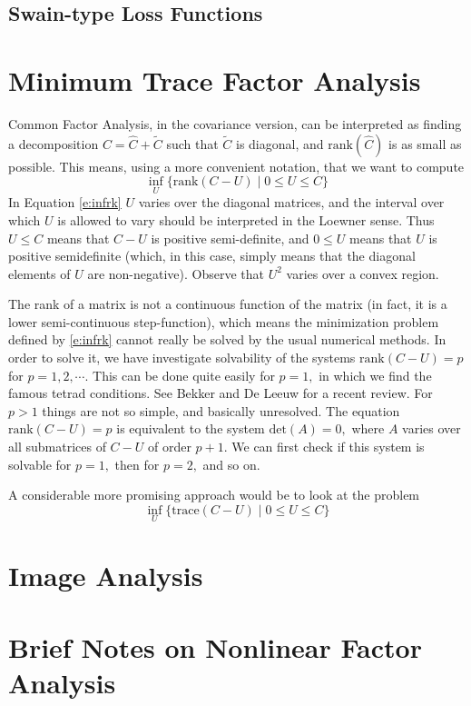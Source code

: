 \documentclass[12pt]{amsart}
\theoremstyle{definition}
\theoremstyle{remark}
\numberwithin{equation}{section}
\begin{document}
\subsection{Swain-type Loss Functions}
\section{Minimum Trace Factor Analysis}
Common Factor Analysis, in the covariance version, can be interpreted as finding
a decomposition $C=\hat C+\tilde C$ such that $\tilde C$ is diagonal, and
$\mathrm{rank}(\hat C)$ is as small as possible. This means, using a more
convenient notation, that we want to compute
%
\begin{equation}\label{e:infrk}
\inf_U\{\mathrm{rank}(C-U)\mid 0\leq U\leq C\}
\end{equation}
%
In Equation \ref{e:infrk} $U$ varies over the diagonal matrices, and the
interval over which $U$ is allowed to vary should be interpreted in the
Loewner sense. Thus $U\leq C$ means that $C-U$ is positive semi-definite,
and $0\leq U$ means that $U$ is positive semidefinite (which, in this
case, simply means that the diagonal elements of $U$ are non-negative).
Observe that $U^2$ varies over a convex region.\par
%
The rank of a matrix is not a continuous function of the matrix (in fact, it
is a lower semi-continuous step-function), which means the minimization problem defined
by  \ref{e:infrk} cannot really be solved by the usual numerical methods. In order
to solve it, we have investigate solvability of 
the systems $\mathrm{rank}(C-U)=p$ for $p=1,2,\cdots.$ This can be done quite
easily for $p=1,$ in which we find the famous tetrad conditions. See Bekker
and De Leeuw \cite{bekker} for a recent review. For $p>1$ things are not
so simple, and basically unresolved.
The equation $\mathrm{rank}(C-U)=p$ is equivalent to the system $\mathrm{det}(A)=0,$
where $A$ varies over all submatrices of $C-U$ of order $p+1.$ We can first
check if this system is solvable for $p=1,$ then for $p=2,$ and so on.\par
%
A considerable more promising approach would be to look at the problem
%
\begin{equation}\label{e:inftr}
\inf_U\{\mathrm{trace}(C-U)\mid 0\leq U\leq C\}
\end{equation}
%
\section{Image Analysis}
%
\section{Brief Notes on Nonlinear Factor Analysis}
\end{document}
